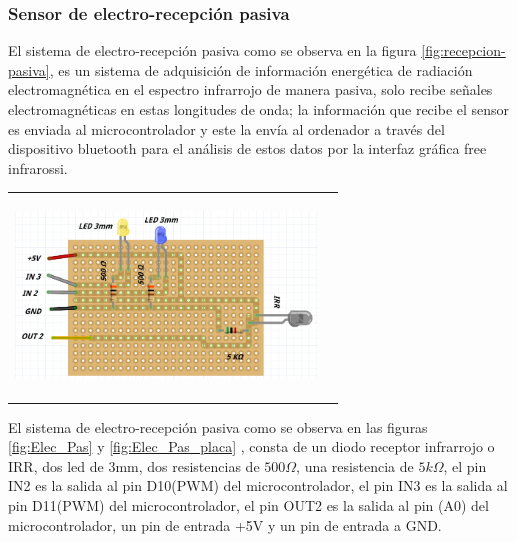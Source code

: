 \documentclass[12]{article}
\newenvironment{Figure}
{\par\medskip\noindent\minipage{\linewidth}}
{\endminipage\par\medskip}
\begin{document}
\begin{multicols}{2}
\subsubsection{Sensor de electro-recepción pasiva}
El sistema de electro-recepción pasiva como se observa en la figura \ref{fig:recepcion-pasiva}, es un sistema de adquisición de información energética de radiación electromagnética en el espectro infrarrojo de manera pasiva, solo recibe señales electromagnéticas en estas longitudes de onda; la información que recibe el sensor es enviada al microcontrolador y este la envía al ordenador a través del dispositivo bluetooth para el análisis de estos datos por la interfaz gráfica free infrarossi.
\begin{Figure}
\center
\begin{tabular}{|l|r|}
\hline
\\
\includegraphics[width=8cm, height=5cm]{img/F5.png}  \\\\ \hline
\end{tabular}
\label{fig:Elec_Pas}
\end{Figure}
El sistema de electro-recepción pasiva como se observa en las figuras \ref{fig:Elec_Pas} y \ref{fig:Elec_Pas_placa} , consta de un diodo receptor infrarrojo o IRR, dos led de 3mm, dos resistencias de $500\Omega$, una resistencia de $5 k\Omega$, el pin IN2 es la salida al pin D10(PWM) del microcontrolador, el pin IN3 es la salida al pin D11(PWM) del microcontrolador, el pin OUT2 es la salida al pin (A0) del microcontrolador, un pin de entrada +5V y un pin de entrada a GND.


\end{multicols}
\end{document}
